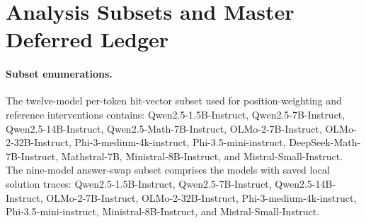 \section{Analysis Subsets and Master Deferred Ledger}
\label{sec:supp-subsets}

\paragraph{Subset enumerations.}
The twelve-model per-token hit-vector subset used for position-weighting and reference interventions contains: Qwen2.5-1.5B-Instruct, Qwen2.5-7B-Instruct, Qwen2.5-14B-Instruct, Qwen2.5-Math-7B-Instruct, OLMo-2-7B-Instruct, OLMo-2-32B-Instruct, Phi-3-medium-4k-instruct, Phi-3.5-mini-instruct, DeepSeek-Math-7B-Instruct, Mathstral-7B, Ministral-8B-Instruct, and Mistral-Small-Instruct.
The nine-model answer-swap subset comprises the models with saved local solution traces: Qwen2.5-1.5B-Instruct, Qwen2.5-7B-Instruct, Qwen2.5-14B-Instruct, OLMo-2-7B-Instruct, OLMo-2-32B-Instruct, Phi-3-medium-4k-instruct, Phi-3.5-mini-instruct, Ministral-8B-Instruct, and Mistral-Small-Instruct.


